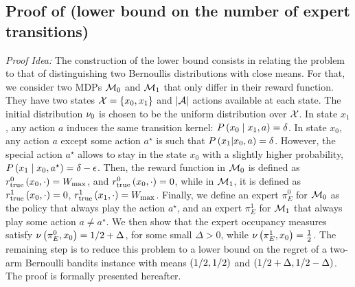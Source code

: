 \subsection{Proof of  (lower bound on the number of expert transitions)}
\label{app:lower_tau_E}

\emph{Proof Idea:} The construction of the lower bound consists in relating the problem to that of distinguishing two Bernoullis distributions with close means. For that, we consider two MDPs $\mathcal{M}_0$ and $\mathcal{M}_1$ that only differ in their reward function. They have two states $\mathcal{X} = \left\{ x_0, x_1 \right\}$ and $\left|\mathcal{A}\right|$ actions available at each state. The initial distribution $\nu_0$ is chosen to be the uniform distribution over $\mathcal{X}$. In state $x_1$, any action $a$ induces the same transition kernel: $P \left( x_0 \mathrel{}\middle|\mathrel{} x_1, a \right) = \delta$. In state $x_0$, any action $a$ except some action $a^\star$ is such that $P \left( x_1 | x_0, a \right) = \delta$. However, the special action $a^\star$ allows to stay in the state $x_0$ with a slightly higher probability, \ie $P \left( x_1 \mathrel{}\middle|\mathrel{} x_0, a^\star \right) = \delta - \epsilon$. Then, the reward function in $\mathcal{M}_0$ is defined as $r_{\textup{true}}^0 \left( x_0, \cdot \right) = W_{\max}$, and $r_{\textup{true}}^0 \left( x_0, \cdot \right) = 0$, while in $\mathcal{M}_1$, it is defined as $r_{\textup{true}}^1 \left( x_0, \cdot \right) = 0$, $r_{\textup{true}}^1 \left( x_1, \cdot \right) = W_{\max}$. Finally, we define an expert $\pi_E^0$ for $\mathcal{M}_0$ as the policy that always play the action $a^\star$, and an expert $\pi_E^1$ for $\mathcal{M}_1$ that always play some action $a \neq a^\star$. We then show that the expert occupancy measures satisfy $\nu \left( \pi_E^0, x_0 \right) = 1/2 + \Delta$, for some small $\Delta > 0$, while $\nu \left( \pi_E^1, x_0 \right) = \frac12$. The remaining step is to reduce this problem to a lower bound on the regret of a two-arm Bernoulli bandits instance with means $\left( 1/2, 1/2 \right)$ and $\left( 1/2 + \Delta, 1/2 - \Delta \right)$. The proof is formally presented hereafter.

\LowerTauE*

